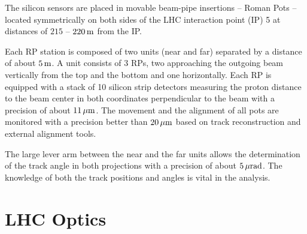 \documentclass[doublecol]{epl/epl2}
\def\un#1{\,{\rm #1}}
\begin{document}
The silicon sensors are placed in movable beam-pipe insertions -- Roman Pots -- located symmetrically on both sides of the LHC interaction point (IP) 5 at distances of $215$ -- $220\un{m}$ from the IP.

Each RP station is composed of two units (near and far) separated by a distance of about $5\un{m}$. A unit consists of 3 RPs, two approaching the outgoing beam vertically from the top and the bottom and one horizontally. Each RP is equipped with a stack of 10 silicon strip detectors measuring the proton distance to the beam center in both coordinates perpendicular to the beam with a precision of about $11\un{\mu m}$.
The movement and the alignment of all pots are monitored with a precision better than $20\un{\mu m}$ based on track reconstruction and external alignment tools.

The large lever arm between the near and the far units allows the determination of the track angle in both projections with a precision of about $5\un{\mu rad}$. The know\-ledge of both the track positions and angles is vital in the analysis. 



\section{LHC Optics}
\end{document}
